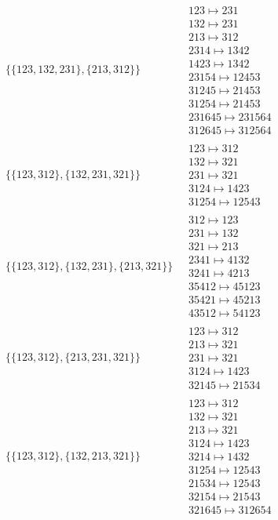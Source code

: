 \begin{scriptsize}
\begin{align}
\begin{matrix}
\end{matrix}
\\
\{\{123, 132, 231\}, \{213, 312\}\}
\ 
&
\begin{matrix}
123 \mapsto 231\\132 \mapsto 231\\213 \mapsto 312\\2314 \mapsto 1342\\1423 \mapsto 1342\\23154 \mapsto 12453\\31245 \mapsto 21453\\31254 \mapsto 21453\\231645 \mapsto 231564\\312645 \mapsto 312564
\end{matrix}
\\
\{\{123, 312\}, \{132, 231, 321\}\}
\ 
&
\begin{matrix}
123 \mapsto 312\\132 \mapsto 321\\231 \mapsto 321\\3124 \mapsto 1423\\31254 \mapsto 12543
\end{matrix}
\\
\{\{123, 312\}, \{132, 231\}, \{213, 321\}\}
\ 
&
\begin{matrix}
312 \mapsto 123\\231 \mapsto 132\\321 \mapsto 213\\2341 \mapsto 4132\\3241 \mapsto 4213\\35412 \mapsto 45123\\35421 \mapsto 45213\\43512 \mapsto 54123
\end{matrix}
\\
\{\{123, 312\}, \{213, 231, 321\}\}
\ 
&
\begin{matrix}
123 \mapsto 312\\213 \mapsto 321\\231 \mapsto 321\\3124 \mapsto 1423\\32145 \mapsto 21534
\end{matrix}
\\
\{\{123, 312\}, \{132, 213, 321\}\}
\ 
&
\begin{matrix}
123 \mapsto 312\\132 \mapsto 321\\213 \mapsto 321\\3124 \mapsto 1423\\3214 \mapsto 1432\\31254 \mapsto 12543\\21534 \mapsto 12543\\32154 \mapsto 21543\\321645 \mapsto 312654

\end{matrix}
\end{align}
\end{scriptsize}
